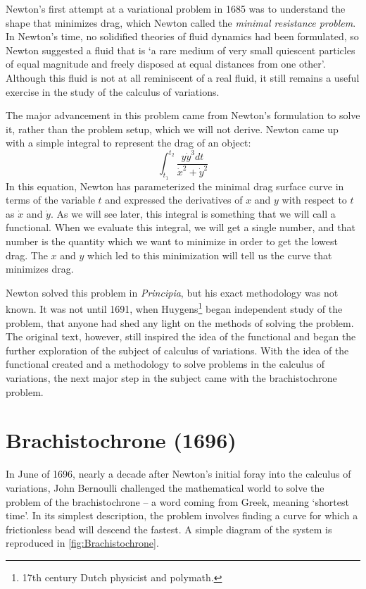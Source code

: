 Newton's first attempt at a variational problem in 1685 was to understand the shape that minimizes drag, which Newton called the \textit{minimal resistance problem}. In Newton's time, no solidified theories of fluid dynamics had been formulated, so Newton suggested a fluid that is `a rare medium of very small quiescent particles of equal magnitude and freely disposed at equal distances from one other'. Although this fluid is not at all reminiscent of a real fluid, it still remains a useful exercise in the study of the calculus of variations.

The major advancement in this problem came from Newton's formulation to solve it, rather than the problem setup, which we will not derive. Newton came up with a simple integral to represent the drag of an object:$$\int_{t_1}^{t_2}{\frac{y\dot{y}^3dt}{\dot{x}^2+\dot{y}^2}}$$In this equation, Newton has parameterized the minimal drag surface curve in terms of the variable $t$ and expressed the derivatives of $x$ and $y$ with respect to $t$ as $\dot{x}$ and $\dot{y}$. As we will see later, this integral is something that we will call a \gls{functional}. When we evaluate this integral, we will get a single number, and that number is the quantity which we want to minimize in order to get the lowest drag. The $x$ and $y$ which led to this minimization will tell us the curve that minimizes drag.

Newton solved this problem in \textit{Principia}, but his exact methodology was not known. It was not until 1691, when Huygens\footnote{17th century Dutch physicist and polymath.} began independent study of the problem, that anyone had shed any light on the methods of solving the problem. The original text, however, still inspired the idea of the \gls{functional} and began the further exploration of the subject of calculus of variations. With the idea of the functional created and a methodology to solve problems in the calculus of variations, the next major step in the subject came with the \gls{brachistochrone} problem.

\section{Brachistochrone (1696)}

In June of 1696, nearly a decade after Newton's initial foray into the calculus of variations, John Bernoulli challenged the mathematical world to solve the problem of the \gls{brachistochrone} -- a word coming from Greek, meaning `shortest time'. In its simplest description, the problem involves finding a curve for which a frictionless bead will descend the fastest. A simple diagram of the system is reproduced in \autoref{fig:Brachistochrone}. 

